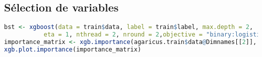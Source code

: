 \subsection{Sélection de variables}
\begin{lstlisting}[language=R]
bst <- xgboost(data = train$data, label = train$label, max.depth = 2,
           eta = 1, nthread = 2, nround = 2,objective = "binary:logistic")
importance_matrix <- xgb.importance(agaricus.train$data@Dimnames[[2]], model = bst)
xgb.plot.importance(importance_matrix)
\end{lstlisting}